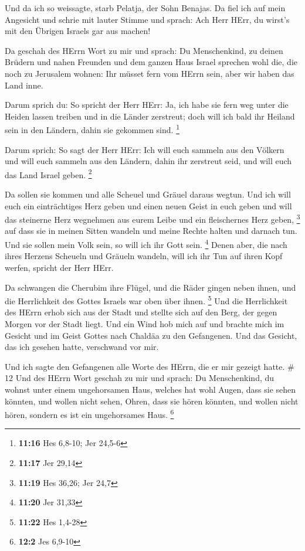  Und da ich so weissagte, starb Pelatja, der Sohn Benajas.
Da fiel ich auf mein Angesicht und schrie mit lauter Stimme und sprach:
Ach Herr HErr, du wirst's mit den Übrigen Israels gar aus machen!

 Da geschah des HErrn Wort zu mir und sprach: 
Du Menschenkind, zu deinen Brüdern und nahen Freunden und dem ganzen
Haus Israel sprechen wohl die, die noch zu Jerusalem wohnen: Ihr müsset
fern vom HErrn sein, aber wir haben das Land inne.

 Darum sprich du: So spricht der Herr HErr: Ja, ich habe
sie fern weg unter die Heiden lassen treiben und in die Länder
zerstreut; doch will ich bald ihr Heiland sein in den Ländern, dahin sie
gekommen sind. \footnote{\textbf{11:16} Hes 6,8-10; Jer 24,5-6}

 Darum sprich: So sagt der Herr HErr: Ich will euch sammeln
aus den Völkern und will euch sammeln aus den Ländern, dahin ihr
zerstreut seid, und will euch das Land Israel geben. \footnote{\textbf{11:17}
  Jer 29,14}

 Da sollen sie kommen und alle Scheuel und Gräuel daraus
wegtun.  Und ich will euch ein einträchtiges Herz geben und
einen neuen Geist in euch geben und will das steinerne Herz wegnehmen
aus eurem Leibe und ein fleischernes Herz geben, \footnote{\textbf{11:19}
  Hes 36,26; Jer 24,7}  auf dass sie in meinen Sitten
wandeln und meine Rechte halten und darnach tun. Und sie sollen mein
Volk sein, so will ich ihr Gott sein. \footnote{\textbf{11:20} Jer 31,33}
 Denen aber, die nach ihres Herzens Scheueln und Gräueln
wandeln, will ich ihr Tun auf ihren Kopf werfen, spricht der Herr HErr.

 Da schwangen die Cherubim ihre Flügel, und die Räder
gingen neben ihnen, und die Herrlichkeit des Gottes Israels war oben
über ihnen. \footnote{\textbf{11:22} Hes 1,4-28}  Und die
Herrlichkeit des HErrn erhob sich aus der Stadt und stellte sich auf den
Berg, der gegen Morgen vor der Stadt liegt.  Und ein Wind
hob mich auf und brachte mich im Gesicht und im Geist Gottes nach
Chaldäa zu den Gefangenen. Und das Gesicht, das ich gesehen hatte,
verschwand vor mir.

 Und ich sagte den Gefangenen alle Worte des HErrn, die er
mir gezeigt hatte. \# 12  Und des HErrn Wort geschah zu mir
und sprach:  Du Menschenkind, du wohnst unter einem
ungehorsamen Haus, welches hat wohl Augen, dass sie sehen könnten, und
wollen nicht sehen, Ohren, dass sie hören könnten, und wollen nicht
hören, sondern es ist ein ungehorsames Haus. \footnote{\textbf{12:2} Jes
  6,9-10}

